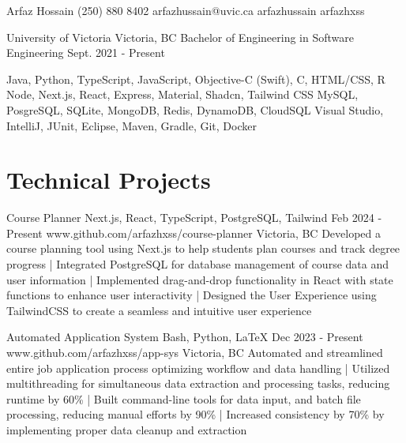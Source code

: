 \documentclass[a4paper,10pt]{article}
\begin{document}
\header
{Arfaz Hossain}				%
{\plus\1 (250) 880 8402}			%
{arfazhussain@uvic.ca} 			%
{arfazhussain} 				%
{arfazhxss} 				%


\education
{University of Victoria}
{Victoria, BC}
{Bachelor of Engineering in Software Engineering}
{Sept. 2021 - Present}

\technicalskills
{Java, Python, TypeScript, JavaScript, Objective-C (Swift), C\plus\plus, HTML/CSS, R}
{Node, Next.js, React, Express, Material, Shadcn, Tailwind CSS}
{MySQL, PosgreSQL, SQLite, MongoDB, Redis, DynamoDB, CloudSQL}
{Visual Studio, IntelliJ, JUnit, Eclipse, Maven, Gradle, Git, Docker}

\section{Technical Projects}
\projectentry
{Course Planner}
{Next.js, React, TypeScript, PostgreSQL, Tailwind}
{Feb 2024 - Present}
{www.github.com/arfazhxss/course-planner}
{Victoria, BC}
{Developed a course planning tool using Next.js to help students plan courses and track degree progress 
| Integrated PostgreSQL for database management of course data and user information 
| Implemented drag-and-drop functionality in React with state functions to enhance user interactivity 
| Designed the User Experience using TailwindCSS to create a seamless and intuitive user experience
}

\projectentry
{Automated Application System}
{Bash, Python, LaTeX}
{Dec 2023 - Present}
{www.github.com/arfazhxss/app-sys}
{Victoria, BC}
{Automated and streamlined entire job application process optimizing workflow and data handling
| Utilized multithreading for simultaneous data extraction and processing tasks, reducing runtime by 60\% 
| Built command-line tools for data input, and batch file processing, reducing manual efforts by 90\% 
| Increased consistency by 70\% by implementing proper data cleanup and extraction}
\end{document}
